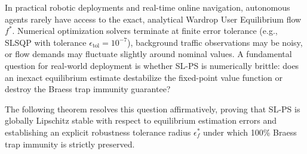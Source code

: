 \documentclass[11pt,a4paper]{article}
\begin{document}
In practical robotic deployments and real-time online navigation, autonomous agents rarely have access to the exact, analytical Wardrop User Equilibrium flow $f^*$. Numerical optimization solvers terminate at finite error tolerance (e.g., SLSQP with tolerance $\epsilon_{\text{tol}} = 10^{-7}$), background traffic observations may be noisy, or flow demands may fluctuate slightly around nominal values. A fundamental question for real-world deployment is whether SL-PS is numerically brittle: does an inexact equilibrium estimate destabilize the fixed-point value function or destroy the Braess trap immunity guarantee?

The following theorem resolves this question affirmatively, proving that SL-PS is globally Lipschitz stable with respect to equilibrium estimation errors and establishing an explicit robustness tolerance radius $\epsilon_f^*$ under which 100\% Braess trap immunity is strictly preserved.
\end{document}
